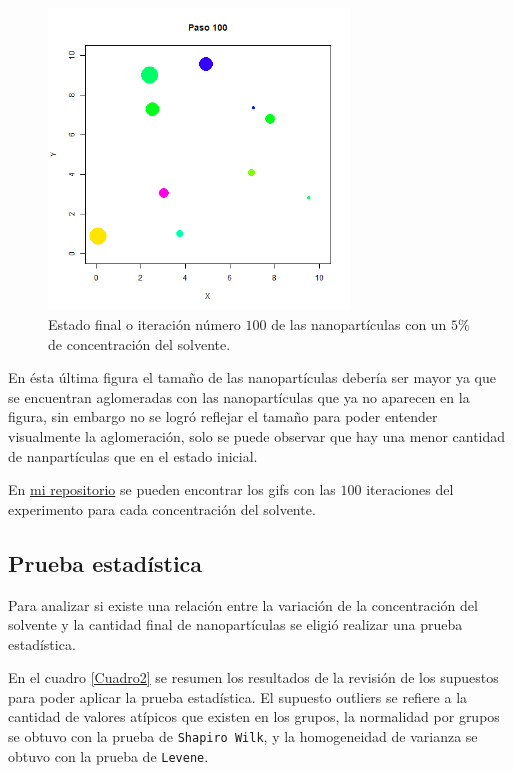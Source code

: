 \documentclass[3p,times,twocolumn]{elsarticle}
\begin{document}
\begin{figure} [h!]%
    \centering
    \includegraphics[width=80mm]{fig_100.png} %
    \caption{Estado final o iteración número $100$ de las nanopartículas con un $5\%$ de concentración del solvente.}
    \label{f6}
\end{figure} 

En ésta última figura el tamaño de las nanopartículas debería ser mayor ya que se encuentran aglomeradas con las nanopartículas que ya no aparecen en la figura, sin embargo no se logró reflejar el tamaño para poder entender visualmente la aglomeración, solo se puede observar que hay una menor cantidad de nanpartículas que en el estado inicial.

En \href{https://github.com/nataliaperez0/Simulation/tree/main/Proyectointegrador/Gifs}{mi repositorio} se pueden encontrar los gifs con las $100$ iteraciones del experimento para cada concentración del solvente.

\subsection{Prueba estadística}
Para analizar si existe una relación entre la variación de la concentración del solvente y la cantidad final de nanopartículas se eligió realizar una prueba estadística.

En el cuadro \ref{Cuadro2} se  resumen los resultados de la revisión de los supuestos para poder aplicar la prueba estadística. El supuesto outliers se refiere a la cantidad de valores atípicos que existen en los grupos, la normalidad por grupos se obtuvo con la prueba de \texttt{Shapiro Wilk}, y la homogeneidad de varianza se obtuvo con la prueba de \texttt{Levene}.
\end{document}
